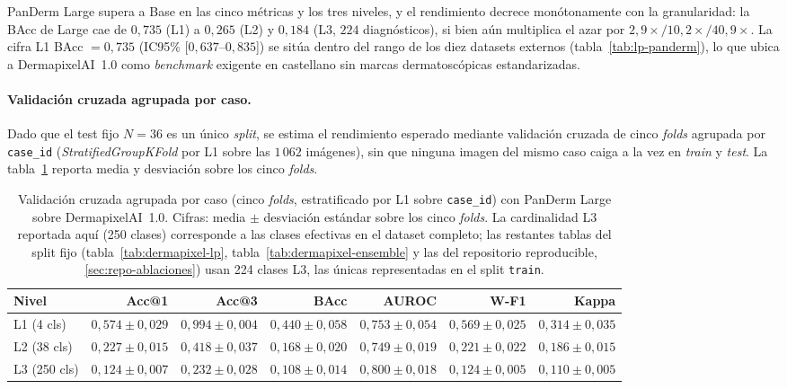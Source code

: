 PanDerm Large supera a Base en las cinco métricas y los tres niveles, y
el rendimiento decrece monótonamente con la granularidad: la BAcc de
Large cae de $0{,}735$ (L1) a $0{,}265$ (L2) y $0{,}184$ (L3, $224$
diagnósticos), si bien aún multiplica el azar por
$2{,}9\times / 10{,}2\times / 40{,}9\times$. La cifra L1
BAcc $= 0{,}735$ (IC95\% [$0{,}637$--$0{,}835$]) se sitúa dentro del
rango de los diez datasets externos (tabla~\ref{tab:lp-panderm}), lo
que ubica a DermapixelAI~1.0 como \emph{benchmark} exigente en
castellano sin marcas dermatoscópicas estandarizadas.


\paragraph{Validación cruzada agrupada por caso.}
Dado que el test fijo $N = 36$ es un único \emph{split}, se estima el
rendimiento esperado mediante validación cruzada de cinco \emph{folds}
agrupada por \texttt{case\_id} (\emph{StratifiedGroupKFold} por L1
sobre las $1\,062$ imágenes), sin que ninguna imagen del mismo caso
caiga a la vez en \emph{train} y \emph{test}. La
tabla~\ref{tab:dermapixel-cv} reporta media y desviación sobre los
cinco \emph{folds}.

\begin{table}[htbp]
\centering
\footnotesize
\setlength{\tabcolsep}{4pt}
\renewcommand{\arraystretch}{0.95}
\caption{Validación cruzada agrupada por caso (cinco \emph{folds},
estratificado por L1 sobre \texttt{case\_id}) con PanDerm Large
sobre DermapixelAI~1.0. Cifras: media $\pm$ desviación estándar
sobre los cinco \emph{folds}. La cardinalidad L3 reportada aquí
(250 clases) corresponde a las clases efectivas en el dataset
completo; las restantes tablas del split fijo
(tabla~\ref{tab:dermapixel-lp}, tabla~\ref{tab:dermapixel-ensemble}
y las del repositorio reproducible, \ref{sec:repo-ablaciones}) usan 224 clases L3, las
únicas representadas en el split \texttt{train}.}
\label{tab:dermapixel-cv}
\begin{tabular}{lrrrrrr}
\hline
Nivel           & Acc@1                 & Acc@3                 & BAcc                  & AUROC                 & W-F1                  & Kappa \\
\hline
L1 (4 cls)      & $0{,}574 \pm 0{,}029$ & $0{,}994 \pm 0{,}004$ & $0{,}440 \pm 0{,}058$ & $0{,}753 \pm 0{,}054$ & $0{,}569 \pm 0{,}025$ & $0{,}314 \pm 0{,}035$ \\
L2 (38 cls)     & $0{,}227 \pm 0{,}015$ & $0{,}418 \pm 0{,}037$ & $0{,}168 \pm 0{,}020$ & $0{,}749 \pm 0{,}019$ & $0{,}221 \pm 0{,}022$ & $0{,}186 \pm 0{,}015$ \\
L3 (250 cls)    & $0{,}124 \pm 0{,}007$ & $0{,}232 \pm 0{,}028$ & $0{,}108 \pm 0{,}014$ & $0{,}800 \pm 0{,}018$ & $0{,}124 \pm 0{,}005$ & $0{,}110 \pm 0{,}005$ \\
\hline
\end{tabular}
\end{table}

